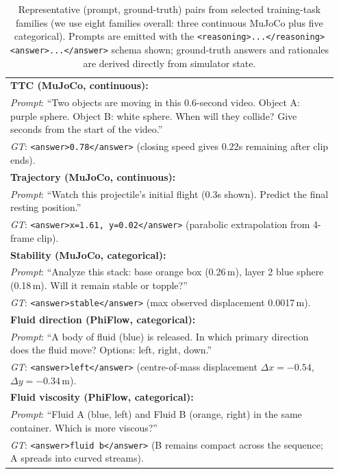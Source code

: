 \documentclass{article}
\begin{document}
\begin{table}[t]
\caption{Representative (prompt, ground-truth) pairs from selected
training-task families (we use eight families overall: three
continuous MuJoCo plus five categorical). Prompts are emitted with
the \texttt{<reasoning>...</reasoning><answer>...</answer>} schema
shown; ground-truth answers and rationales are derived directly
from simulator state.}
\label{tab:trainsamples}
\centering
\footnotesize
\begin{tabular}{p{0.95\linewidth}}
\toprule
\textbf{TTC (MuJoCo, continuous):}\\
\textit{Prompt}: ``Two objects are moving in this 0.6-second video.
Object A: purple sphere. Object B: white sphere. When will they
collide? Give seconds from the start of the video.''\\
\textit{GT}: \texttt{<answer>0.78</answer>} (closing speed gives
$0.22$s remaining after clip ends).\\
\midrule
\textbf{Trajectory (MuJoCo, continuous):}\\
\textit{Prompt}: ``Watch this projectile's initial flight (0.3s
shown). Predict the final resting position.''\\
\textit{GT}: \texttt{<answer>x=1.61, y=0.02</answer>} (parabolic
extrapolation from 4-frame clip).\\
\midrule
\textbf{Stability (MuJoCo, categorical):}\\
\textit{Prompt}: ``Analyze this stack: base orange box (0.26\,m),
layer 2 blue sphere (0.18\,m). Will it remain stable or topple?''\\
\textit{GT}: \texttt{<answer>stable</answer>} (max observed
displacement 0.0017\,m).\\
\midrule
\textbf{Fluid direction (PhiFlow, categorical):}\\
\textit{Prompt}: ``A body of fluid (blue) is released. In which
primary direction does the fluid move? Options: left, right, down.''\\
\textit{GT}: \texttt{<answer>left</answer>} (centre-of-mass
displacement $\Delta x{=}{-0.54}$, $\Delta y{=}{-0.34}$\,m).\\
\midrule
\textbf{Fluid viscosity (PhiFlow, categorical):}\\
\textit{Prompt}: ``Fluid A (blue, left) and Fluid B (orange, right)
in the same container. Which is more viscous?''\\
\textit{GT}: \texttt{<answer>fluid b</answer>} (B remains compact
across the sequence; A spreads into curved streams).\\
\bottomrule
\end{tabular}
\end{table}
\end{document}
